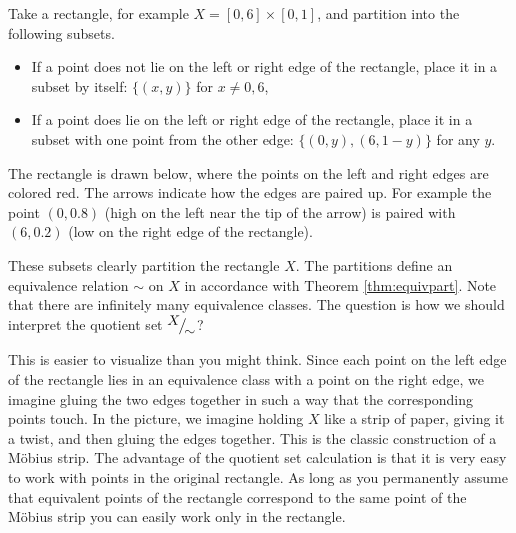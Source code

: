 
Take a rectangle, for example $X=[0,6]\times[0,1]$, and partition into the following subsets.
\begin{itemize}
	\item If a point does not lie on the left or right edge of the rectangle, place it in a subset by itself: $\{(x,y)\}$ for $x\neq 0,6$,
	\item If a point does lie on the left or right edge of the rectangle, place it in a subset with one point from the other edge: $\{(0,y),(6,1-y)\}$ for any $y$.
\end{itemize}
The rectangle is drawn below, where the points on the left and right edges are colored red. The arrows indicate how the edges are paired up. For example the point $(0,0.8)$ (high on the left near the tip of the arrow) is paired with $(6,0.2)$ (low on the right edge of the rectangle).\par
These subsets clearly partition the rectangle $X$. The partitions define an equivalence relation $\sim$ on $X$ in accordance with Theorem \ref{thm:equivpart}. Note that there are infinitely many equivalence classes. The question is how we should interpret the quotient set ${}^{\textstyle {X}}\!\big/_{\textstyle \!{\sim}}$?\par
This is easier to visualize than you might think. Since each point on the left edge of the rectangle lies in an equivalence class with a point on the right edge, we imagine gluing the two edges together in such a way that the corresponding points touch. In the picture, we imagine holding $X$ like a strip of paper, giving it a twist, and then gluing the edges together. This is the classic construction of a Möbius strip. The advantage of the quotient set calculation is that it is very easy to work with points in the original rectangle. As long as you permanently assume that equivalent points of the rectangle correspond to the same point of the Möbius strip you can easily work only in the rectangle.\par

